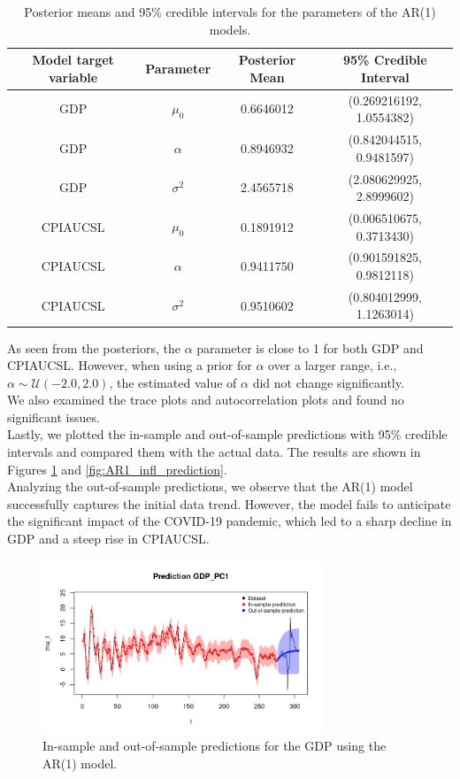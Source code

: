 \begin{table}[H]
    \centering
    \begin{tabular}{|c|c|c|c|}
        \hline
        \textbf{Model target variable } & \textbf{Parameter } & \textbf{Posterior Mean } & \textbf{95\% Credible Interval } \\
        \hline
        GDP      & $\mu_0$    & 0.6646012 & (0.269216192, 1.0554382) \\
        GDP      & $\alpha$   & 0.8946932 & (0.842044515, 0.9481597) \\
        GDP      & $\sigma^2$ & 2.4565718 & (2.080629925, 2.8999602) \\
        CPIAUCSL & $\mu_0$    & 0.1891912 & (0.006510675, 0.3713430) \\
        CPIAUCSL & $\alpha$   & 0.9411750 & (0.901591825, 0.9812118) \\
        CPIAUCSL & $\sigma^2$ & 0.9510602 & (0.804012999, 1.1263014) \\
        \hline
    \end{tabular}
    \caption{Posterior means and 95\% credible intervals for the parameters of the AR(1) models.}
    \label{tab:AR1_posteriors}
\end{table}
As seen from the posteriors, the $\alpha$ parameter is close to 1 for both GDP and CPIAUCSL. However, when using a prior for $\alpha$ over a larger range, i.e., $\alpha \sim \mathcal{U}(-2.0, 2.0)$, the estimated value of $\alpha$ did not change significantly. \\
We also examined the trace plots and autocorrelation plots and found no significant issues. \\
Lastly, we plotted the in-sample and out-of-sample predictions with 95\% credible intervals and compared them with the actual data. The results are shown in Figures \ref{fig:AR1_gdp_prediction} and \ref{fig:AR1_infl_prediction}. \\
Analyzing the out-of-sample predictions, we observe that the AR(1) model successfully captures the initial data trend. However, the model fails to anticipate the significant impact of the COVID-19 pandemic, which led to a sharp decline in GDP and a steep rise in CPIAUCSL. \\
\begin{figure}[H]
    \centering
    \includegraphics[width=0.75\textwidth]{images/2-AR/gdp_prediction.png}
    \caption{In-sample and out-of-sample predictions for the GDP using the AR(1) model.}
    \label{fig:AR1_gdp_prediction}
\end{figure}
